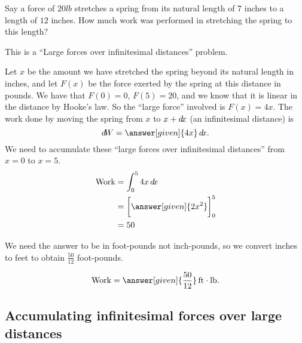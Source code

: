 \documentclass{ximera}
\begin{document}
\begin{example}
  Say a force of $20\unit{lb}$ stretches a spring from its natural
  length of $7$ inches to a length of $12$ inches. How much work was
  performed in stretching the spring to this length?
  \begin{explanation}
    \begin{hint}
      This is a ``Large forces over infinitesimal distances'' problem.
    \end{hint}
    Let $x$ be the amount we have stretched the spring beyond its
    natural length in inches, and let $F(x)$ be the force exerted by
    the spring at this distance in pounds.  We have that $F(0)=0$,
    $F(5) = 20$, and we know that it is linear in the distance by
    Hooke's law.  So the ``large force'' involved is $F(x) = 4x$.  The
    work done by moving the spring from $x$ to $x+\mathop{}\!d\! x$ (an
    infinitesimal distance) is
    \[
    \d W = \answer[given]{4x} \d x.
    \]
    We need to accumulate these ``large forces over infinitesimal
    distances'' from $x=0$ to $x=5$.
    \begin{align*}
      \text{Work} &= \int_0^5 4x \d x\\
      &= \eval{\answer[given]{2x^2}}_0^5\\
      &=50
    \end{align*}
  \begin{hint}
    We need the answer to be in foot-pounds not inch-pounds, so we convert
    inches to feet to obtain $\frac{50}{12}$ foot-pounds.
  \end{hint}
    \[
    \text{Work} = \answer[given]{\frac{50}{12}} \unit{ft}\cdot\unit{lb}.
    \]
  \end{explanation}
\end{example}







\subsection{Accumulating infinitesimal forces over large distances}
\end{document}
